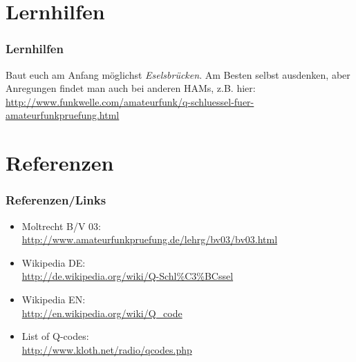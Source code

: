\section*{Lernhilfen}

\begin{frame}
    \frametitle{Lernhilfen}

    Baut euch am Anfang möglichst \emph{Eselsbrücken}. Am Besten selbst
    ausdenken, aber Anregungen findet man auch bei anderen HAMs, z.B. hier: \\[2em]

    \url{http://www.funkwelle.com/amateurfunk/q-schluessel-fuer-amateurfunkpruefung.html}

\end{frame}

\section*{Referenzen}

\begin{frame}
    \frametitle{Referenzen/Links}
    
    \footnotesize
    \begin{itemize}
        \item Moltrecht B/V 03: \\
              \url{http://www.amateurfunkpruefung.de/lehrg/bv03/bv03.html}
        \item Wikipedia DE: \\
              \url{http://de.wikipedia.org/wiki/Q-Schl\%C3\%BCssel}
        \item Wikipedia EN: \\
              \url{http://en.wikipedia.org/wiki/Q_code}
        \item List of Q-codes: \\
              \url{http://www.kloth.net/radio/qcodes.php}
    \end{itemize}

\end{frame}


